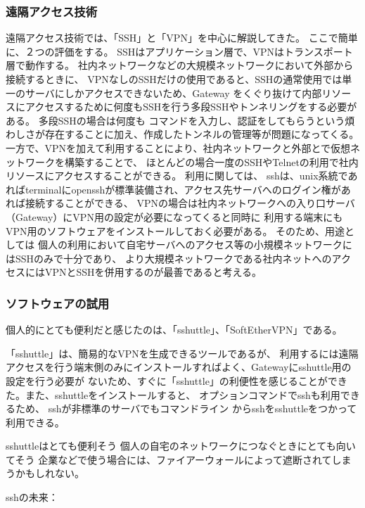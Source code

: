 \documentclass[11pt,a4j,titlepage]{jreport}
\begin{document}
\subsubsection*{遠隔アクセス技術}
遠隔アクセス技術では、「SSH」と「VPN」を中心に解説してきた。
ここで簡単に、２つの評価をする。
SSHはアプリケーション層で、VPNはトランスポート層で動作する。
社内ネットワークなどの大規模ネットワークにおいて外部から接続するときに、
VPNなしのSSHだけの使用であると、SSHの通常使用では単一のサーバにしかアクセスできないため、Gateway
をくぐり抜けて内部リソースにアクセスするために何度もSSHを行う多段SSHやトンネリングをする必要がある。
多段SSHの場合は何度も
コマンドを入力し、認証をしてもらうという煩わしさが存在することに加え、作成したトンネルの管理等が問題になってくる。
一方で、VPNを加えて利用することにより、社内ネットワークと外部とで仮想ネットワークを構築することで、
ほとんどの場合一度のSSHやTelnetの利用で社内リソースにアクセスすることができる。
利用に関しては、
sshは、unix系統であればterminalにopensshが標準装備され、アクセス先サーバへのログイン権があれば接続することができる、
VPNの場合は社内ネットワークへの入り口サーバ（Gateway）にVPN用の設定が必要になってくると同時に
利用する端末にもVPN用のソフトウェアをインストールしておく必要がある。
そのため、用途としては
個人の利用において自宅サーバへのアクセス等の小規模ネットワークにはSSHのみで十分であり、
より大規模ネットワークである社内ネットへのアクセスにはVPNとSSHを併用するのが最善であると考える。
\fi

\subsubsection*{ソフトウェアの試用}
個人的にとても便利だと感じたのは、「sshuttle」、「SoftEtherVPN」である。\par
「sshuttle」は、簡易的なVPNを生成できるツールであるが、
利用するには遠隔アクセスを行う端末側のみにインストールすればよく、Gatewayにsshuttle用の設定を行う必要が
ないため、すぐに「sshuttle」の利便性を感じることができた。また、sshuttleをインストールすると、
オプションコマンドでsshも利用できるため、
sshが非標準のサーバでもコマンドライン からsshをsshuttleをつかって利用できる。


sshuttleはとても便利そう
個人の自宅のネットワークにつなぐときにとても向いてそう
企業などで使う場合には、ファイアーウォールによって遮断されてしまうかもしれない。


sshの未来：
\fi




\end{document}
